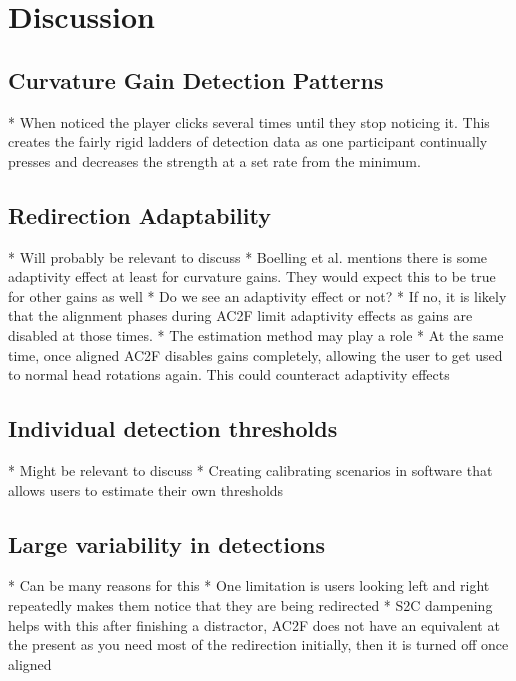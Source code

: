\section{Discussion}


\subsection{Curvature Gain Detection Patterns}
* When noticed the player clicks several times until they stop noticing it. This creates the fairly rigid ladders of detection data as one participant continually presses and decreases the strength at a set rate from the minimum. 

\subsection{Redirection Adaptability}
* Will probably be relevant to discuss
* Boelling et al. mentions there is some adaptivity effect at least for curvature gains. They would expect this to be true for other gains as well
* Do we see an adaptivity effect or not?
   * If no, it is likely that the alignment phases during AC2F limit adaptivity effects as gains are disabled at those times.
* The estimation method may play a role
* At the same time, once aligned AC2F disables gains completely, allowing the user to get used to normal head rotations again. This could counteract adaptivity effects

\subsection{Individual detection thresholds}
* Might be relevant to discuss
* Creating calibrating scenarios in software that allows users to estimate their own thresholds

\subsection{Large variability in detections}
* Can be many reasons for this
* One limitation is users looking left and right repeatedly makes them notice that they are being redirected
* S2C dampening helps with this after finishing a distractor, AC2F does not have an equivalent at the present as you need most of the redirection initially, then it is turned off once aligned



